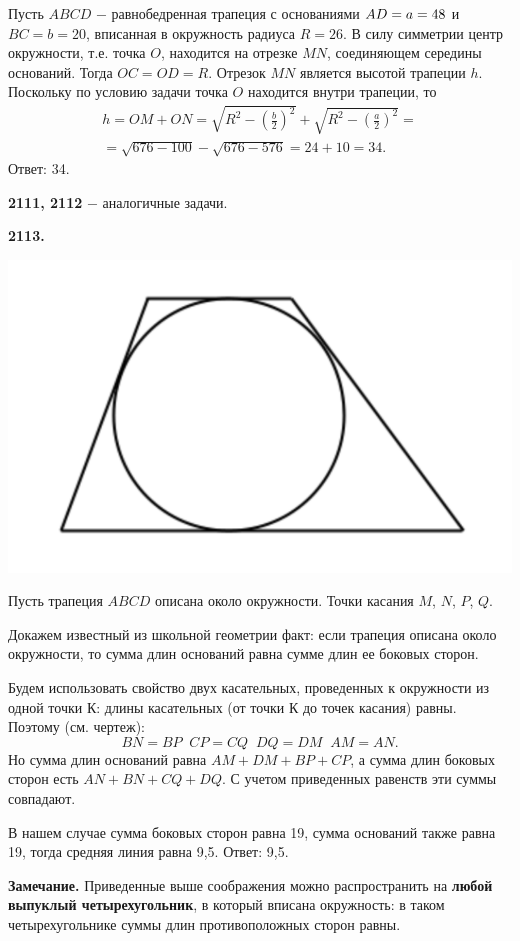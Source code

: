 Пусть $ABCD$ $-$ равнобедренная трапеция с основаниями $\linebreak AD = a =48$ и $BC = b = 20$, вписанная в окружность радиуса $R=26$. В силу симметрии центр окружности, т.е. точка $O$, находится на отрезке $MN$, соединяющем середины оснований. Тогда $OC=OD=R$. Отрезок $MN$ является высотой трапеции $h$. Поскольку по условию задачи точка $O$ находится внутри трапеции, то
\begin{eqnarray*}
h=OM+ON=\sqrt{R^2- \left( \frac{b}{2} \right)^2} +\sqrt{R^2- \left( \frac{a}{2} \right)^2} =\\ =\sqrt{676-100} - \sqrt{676-576}=24+10=34.
\end{eqnarray*} \null \hspace*{\fill} Ответ: 34.

\textbf{2111, 2112} $-$ аналогичные задачи.

\textbf{2113.}

{\centering \includegraphics[width=0.4\linewidth]{Geometry/Content/41.png}
	
}

 Пусть трапеция $ABCD$ описана около окружности. Точки касания $M$, $N$, $P$, $Q$. 
  
Докажем известный из школьной геометрии факт: если трапеция описана около окружности, то сумма длин оснований равна сумме длин ее боковых сторон.

Будем использовать свойство двух касательных, проведенных к окружности из одной точки $К$:   длины касательных (от точки $К$ до точек касания) равны. Поэтому (см. чертеж):
\[
BN=BP\;\;CP=CQ\;\;DQ=DM\;\;AM=AN.
\]
Но сумма длин оснований равна $AM+DM+BP+CP$, а сумма длин боковых сторон есть $AN+BN+CQ+DQ$. С учетом приведенных равенств эти суммы совпадают.

В нашем случае  сумма боковых сторон равна 19, сумма оснований также равна 19, тогда средняя линия равна 9,5. \newline \null \hspace*{\fill} Ответ: 9,5.

\textbf{Замечание.} Приведенные выше соображения можно распространить на \textbf{любой выпуклый четырехугольник}, в который вписана окружность: в таком четырехугольнике суммы длин противоположных сторон равны. 

